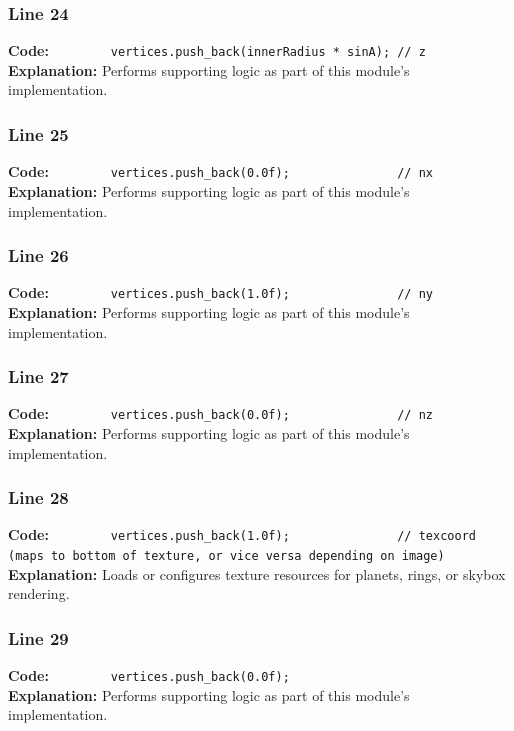 \documentclass[11pt,a4paper]{article}
\begin{document}
\subsubsection*{Line 24}
\textbf{Code:} \verb|        vertices.push_back(innerRadius * sinA); // z|\\
\textbf{Explanation:} Performs supporting logic as part of this module's implementation.

\subsubsection*{Line 25}
\textbf{Code:} \verb|        vertices.push_back(0.0f);               // nx|\\
\textbf{Explanation:} Performs supporting logic as part of this module's implementation.

\subsubsection*{Line 26}
\textbf{Code:} \verb|        vertices.push_back(1.0f);               // ny|\\
\textbf{Explanation:} Performs supporting logic as part of this module's implementation.

\subsubsection*{Line 27}
\textbf{Code:} \verb|        vertices.push_back(0.0f);               // nz|\\
\textbf{Explanation:} Performs supporting logic as part of this module's implementation.

\subsubsection*{Line 28}
\textbf{Code:} \verb|        vertices.push_back(1.0f);               // texcoord (maps to bottom of texture, or vice versa depending on image)|\\
\textbf{Explanation:} Loads or configures texture resources for planets, rings, or skybox rendering.

\subsubsection*{Line 29}
\textbf{Code:} \verb|        vertices.push_back(0.0f);|\\
\textbf{Explanation:} Performs supporting logic as part of this module's implementation.
\end{document}

